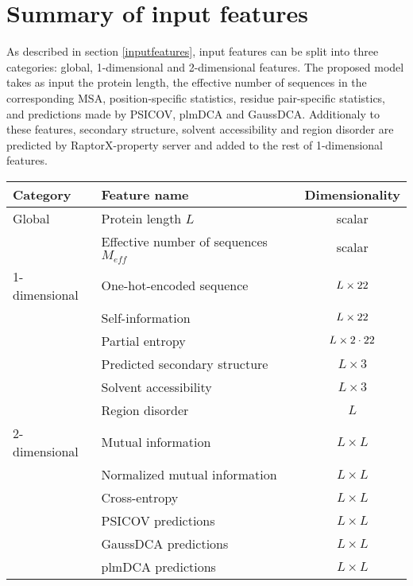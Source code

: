 \section{Summary of input features}

  As described in section \ref{inputfeatures}, input features can be split into three categories:
  global, 1-dimensional and 2-dimensional features.
  The proposed model takes as input the protein length, the effective number of sequences
  in the corresponding MSA, position-specific statistics,
  residue pair-specific statistics, and predictions made by PSICOV, plmDCA and GaussDCA.
  Additionaly to these features, secondary structure, solvent accessibility and
  region disorder are predicted by RaptorX-property server and added to the rest of
  1-dimensional features.

  \begin{table}[H]
    \centering
    \begin{tabular}{|l|l|c|}
      \hline
      Category & Feature name & Dimensionality \\
      \hline
      \hline
      Global & Protein length $L$ & scalar \\
             & Effective number of sequences $M_{eff}$ & scalar \\
      \hline
      1-dimensional & One-hot-encoded sequence & $L \times 22$ \\
                    & Self-information & $L \times 22$ \\
                    & Partial entropy & $L \times 2 \cdot 22$ \\
                    & Predicted secondary structure & $L \times 3$ \\
                    & Solvent accessibility & $L \times 3$ \\
                    & Region disorder & $L$ \\
      \hline
      2-dimensional & Mutual information & $L \times L$ \\
                    & Normalized mutual information & $L \times L$ \\
                    & Cross-entropy & $L \times L$ \\
                    & PSICOV predictions & $L \times L$ \\
                    & GaussDCA predictions & $L \times L$ \\
                    & plmDCA predictions & $L \times L$ \\
      \hline
    \end{tabular}
    \label{tabinputfeatures}
  \end{table}